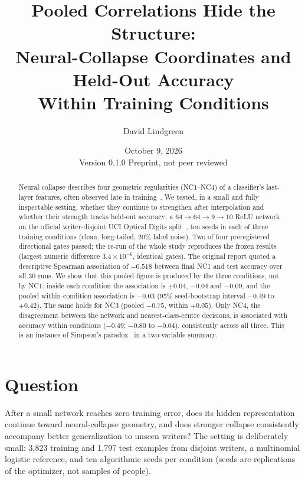 \documentclass[11pt]{article}
\title{Pooled Correlations Hide the Structure:\\
Neural-Collapse Coordinates and Held-Out Accuracy\\
Within Training Conditions}
\author{David Lindgreen}
\date{October 9, 2026 \\[2pt] \small Version 0.1.0 \quad Preprint, not peer reviewed}
\begin{document}
\maketitle

\begin{abstract}
Neural collapse describes four geometric regularities (NC1--NC4) of a classifier's last-layer features, often observed late in
training~\cite{papyan2020}. We tested, in a small and fully inspectable setting, whether they continue to strengthen after
interpolation and whether their strength tracks held-out accuracy: a $64\to64\to9\to10$ ReLU network on the official writer-disjoint
UCI Optical Digits split~\cite{uci1998}, ten seeds in each of three training conditions (clean, long-tailed, 20\% label noise).
Two of four preregistered directional gates passed; the re-run of the whole study reproduces the frozen results (largest numeric
difference $3.4\times10^{-6}$, identical gates). The original report quoted a descriptive Spearman association of $-0.518$
between final NC1 and test accuracy over all 30 runs. We show that this pooled figure is produced by the three conditions, not by
NC1: inside each condition the association is $+0.04$, $-0.04$ and $-0.09$, and the pooled within-condition association is
$-0.03$ (95\% seed-bootstrap interval $-0.49$ to $+0.42$). The same holds for NC3 (pooled $-0.75$, within $+0.05$). Only NC4, the
disagreement between the network and nearest-class-centre decisions, is associated with accuracy within conditions
($-0.49$; $-0.80$ to $-0.04$), consistently across all three. This is an instance of Simpson's paradox~\cite{simpson1951}
in a two-variable summary.
\end{abstract}

\section{Question}
After a small network reaches zero training error, does its hidden representation continue toward neural-collapse geometry, and
does stronger collapse consistently accompany better generalization to unseen writers? The setting is deliberately small:
3{,}823 training and 1{,}797 test examples from disjoint writers, a multinomial logistic reference, and ten algorithmic seeds
per condition (seeds are replications of the optimizer, not samples of people).
\end{document}

